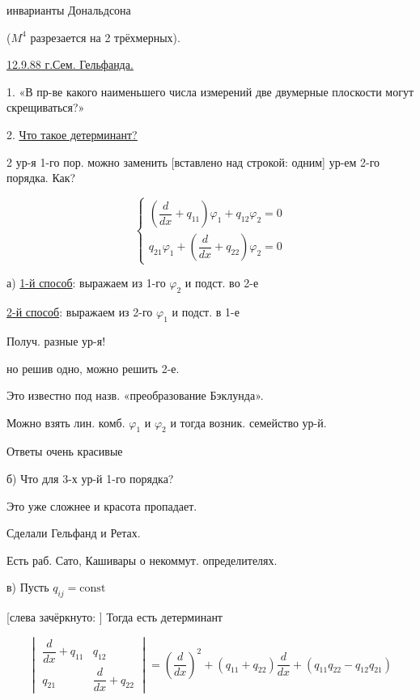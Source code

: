 инварианты Дональдсона

($M^4$ разрезается на 2 трёхмерных).



\underline{12.9.88 г.}\qquad \underline{\underline{Сем. Гельфанда.}}

1. «В пр-ве какого наименьшего числа измерений две двумерные плоскости
могут скрещиваться?»

2. \underline{\underline{Что такое детерминант?}}

2 ур-я 1-го пор. можно заменить [вставлено над строкой: одним]
ур-ем 2-го порядка. Как?

\begin{equation*}
\begin{cases}
\left(\dfrac{d}{dx}+q_{11}\right)\varphi_1+q_{12}\varphi_2=0\\
q_{21}\varphi_1+\left(\dfrac{d}{dx}+q_{22}\right)\varphi_2=0
\end{cases}
\tag{1}
\end{equation*}

а) \underline{1-й способ}: выражаем из 1-го $\varphi_2$ и подст. во 2-е

\underline{2-й способ}: выражаем из 2-го $\varphi_1$ и подст. в 1-е

Получ. разные ур-я!

но решив одно, можно решить 2-е.

Это известно под назв. «преобразование Бэклунда».

Можно взять лин. комб. $\varphi_1$ и $\varphi_2$ и тогда возник. семейство ур-й.

Ответы очень красивые

б) Что для 3-х ур-й 1-го порядка?

Это уже сложнее и красота пропадает.

Сделали Гельфанд и Ретах.

Есть раб. Сато, Кашивары о некоммут. определителях.

в) Пусть $q_{ij}=\mathrm{const}$

[слева зачёркнуто: ]
Тогда есть детерминант

\begin{equation*}
\begin{vmatrix}
\dfrac{d}{dx}+q_{11}&q_{12}\\
q_{21}&\dfrac{d}{dx}+q_{22}
\end{vmatrix}
=\left(\frac{d}{dx}\right)^2+(q_{11}+q_{22})\frac{d}{dx}
+(q_{11}q_{22}-q_{12}q_{21})
\tag{2}
\end{equation*}

